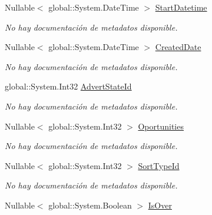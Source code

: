 \begin{DoxyCompactItemize}
Nullable$<$ global\-::\-System.\-Date\-Time $>$ \hyperlink{class_game_memory_1_1_adverts_a6f50aaad65f26ececf1f0e9d69dc006a}{Start\-Datetime}
\begin{DoxyCompactList}\small\item\em No hay documentación de metadatos disponible. \end{DoxyCompactList}\item 
Nullable$<$ global\-::\-System.\-Date\-Time $>$ \hyperlink{class_game_memory_1_1_adverts_a52b3de606dfe54c1fe35ea83a53d42e6}{Created\-Date}
\begin{DoxyCompactList}\small\item\em No hay documentación de metadatos disponible. \end{DoxyCompactList}\item 
global\-::\-System.\-Int32 \hyperlink{class_game_memory_1_1_adverts_a76a43f9edd08d0588a03cb95d6be0bcf}{Advert\-State\-Id}
\begin{DoxyCompactList}\small\item\em No hay documentación de metadatos disponible. \end{DoxyCompactList}\item 
Nullable$<$ global\-::\-System.\-Int32 $>$ \hyperlink{class_game_memory_1_1_adverts_af3a5c0ddac27db7dd0bbf88ac1b250df}{Oportunities}
\begin{DoxyCompactList}\small\item\em No hay documentación de metadatos disponible. \end{DoxyCompactList}\item 
Nullable$<$ global\-::\-System.\-Int32 $>$ \hyperlink{class_game_memory_1_1_adverts_a28c7f653f4c8f1d88ab3520408486ea3}{Sort\-Type\-Id}
\begin{DoxyCompactList}\small\item\em No hay documentación de metadatos disponible. \end{DoxyCompactList}\item 
Nullable$<$ global\-::\-System.\-Boolean $>$ \hyperlink{class_game_memory_1_1_adverts_aef114b2666c933d5bba90f6a5def6e29}{Is\-Over}

\end{DoxyCompactItemize}
